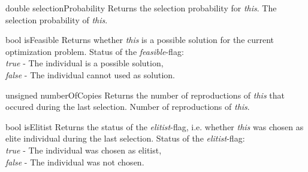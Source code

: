 \vspace*{4ex}

\setConstInstance
\printEmptyMethodReturn
{double}
{selectionProbability}
{Returns the selection probability for {\em this}.}
{The selection probability of {\em this}.}

\vspace*{4ex}

\setConstInstance
\printEmptyMethodReturn
{bool}
{isFeasible}
{Returns whether {\em this} is a possible solution for the
 current optimization problem.}
{Status of the {\em feasible}-flag:\\
 {\em true} - The individual is a possible solution,\\
 {\em false} - The individual cannot used as solution.}

\vspace*{4ex}

\setConstInstance
\printEmptyMethodReturn
{unsigned}
{numberOfCopies}
{Returns the number of reproductions of {\em this} that occured
 during the last selection.}
{Number of reproductions of {\em this}.}

\clearpage

\setConstInstance
\printEmptyMethodReturn
{bool}
{isElitist}
{Returns the status of the {\em elitist}-flag, i.e. whether {\em this} 
 was chosen as elite individual during the last selection.}
{Status of the {\em elitist}-flag:\\
 {\em true} - The individual was chosen as elitist,\\
 {\em false} - The individual was not chosen.}

